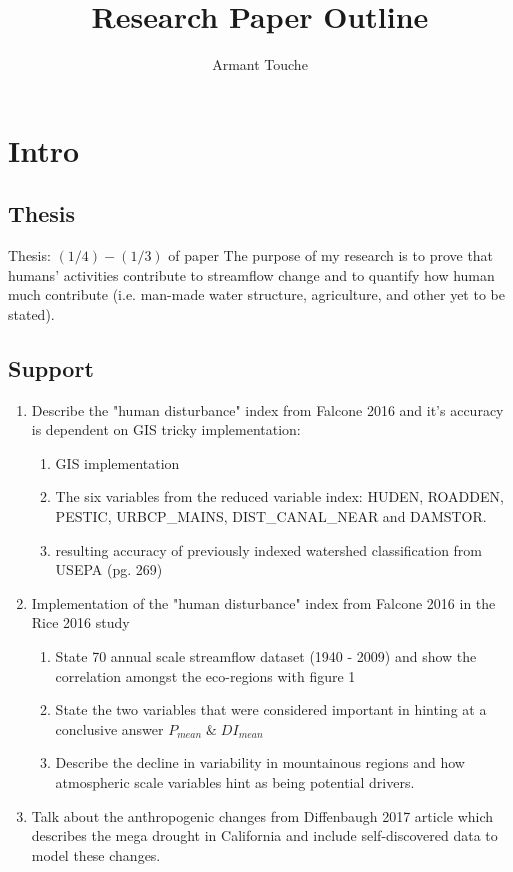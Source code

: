 \documentclass{article}
\begin{document}
\title{\vspace{-2cm}Research Paper Outline}
\author{Armant Touche}
\maketitle

\section{Intro}

    \subsection{Thesis} Thesis: $(1/4) - (1/3)$ of paper The purpose of my research is to prove that humans' activities contribute to streamflow change and to quantify how human much contribute (i.e. man-made water structure, agriculture, and other yet to be stated).

    \subsection{Support}
    \begin{enumerate}
        \item Describe the "human disturbance" index from Falcone 2016 and it's accuracy is dependent on GIS tricky implementation:
            \begin{enumerate}
                \item GIS implementation
                \item The six variables from the reduced variable index: HUDEN, ROADDEN, PESTIC, URBCP\_MAINS, DIST\_CANAL\_NEAR and DAMSTOR. 
                \item resulting accuracy of previously indexed watershed classification from USEPA (pg. 269)
            \end{enumerate}

        \item Implementation of the "human disturbance" index from Falcone 2016 in the Rice 2016 study
            \begin{enumerate}
                \item State 70 annual scale streamflow dataset (1940 - 2009) and show the correlation amongst the eco-regions with figure 1
                \item State the two variables that were considered important in hinting at a conclusive answer $P_\textit{mean} \;\&\; {DI}_\textit{mean}$ 
                \item Describe the decline in variability in mountainous regions and how atmospheric scale variables hint as being potential drivers. 
            \end{enumerate}

        \item Talk about the anthropogenic changes from Diffenbaugh 2017 article which describes the mega drought in California and include self-discovered data to model these changes.


    \end{enumerate}
\end{document}
